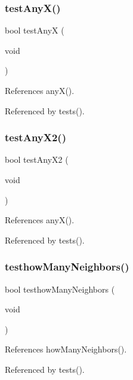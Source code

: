 \subsubsection{test\+Any\+X()}
{\footnotesize\ttfamily bool test\+AnyX (\begin{DoxyParamCaption}\item[{void}]{ }\end{DoxyParamCaption})}



References any\+X().



Referenced by tests().

\mbox{\label{tests_8c_a9d0f0ee72a131b3f80b129204e602f8f}} 
\subsubsection{test\+Any\+X2()}
{\footnotesize\ttfamily bool test\+Any\+X2 (\begin{DoxyParamCaption}\item[{void}]{ }\end{DoxyParamCaption})}



References any\+X().



Referenced by tests().

\mbox{\label{tests_8c_a8b7ce08ce78276372b8d74b2992567a0}} 
\subsubsection{testhow\+Many\+Neighbors()}
{\footnotesize\ttfamily bool testhow\+Many\+Neighbors (\begin{DoxyParamCaption}\item[{void}]{ }\end{DoxyParamCaption})}



References how\+Many\+Neighbors().



Referenced by tests().

\mbox{\label{tests_8c_a53e35009f6dab4bf3c1196de8c3513d7}} 
